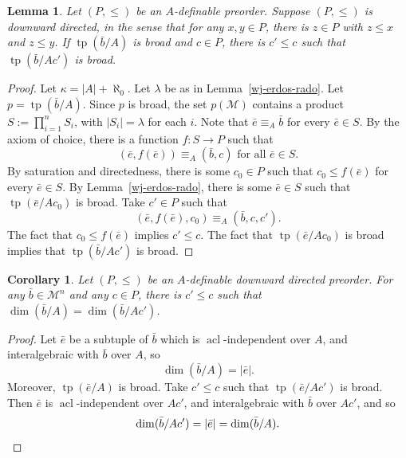 \documentclass{amsart}
\newtheorem{lemma}[theorem]{Lemma}
\newtheorem{corollary}[theorem]{Corollary}
\theoremstyle{definition}
\newcommand{\acl}{\operatorname{acl}}
\newcommand{\tp}{\operatorname{tp}}
\begin{document}
\begin{lemma}
  Let $(P,\le)$ be an $A$-definable preorder.  Suppose $(P,\le)$ is
  downward directed, in the sense that for any $x,y \in P$, there is
  $z \in P$ with $z \le x$ and $z \le y$.  If $\tp(\bar{b}/A)$ is broad
  and $c \in P$, there is $c' \le c$ such that $\tp(\bar{b}/Ac')$ is
  broad.
\end{lemma}
\begin{proof}
  Let $\kappa = |A| + \aleph_0$.  Let $\lambda$ be as in
  Lemma~\ref{wj-erdos-rado}.  Let $p = \tp(\bar{b}/A)$.  Since $p$ is broad,
  the set $p(\mathcal{M})$ contains a product $S := \prod_{i=1}^n S_i$, with
  $|S_i| = \lambda$ for each $i$.  Note that $\bar{e} \equiv_A \bar{b}$ for
  every $\bar{e} \in S$.  By the axiom of choice, there is a function $f :
  S \to P$ such that
  \begin{equation*}
    (\bar{e},f(\bar{e})) \equiv_A (\bar{b},c) \text{ for all } \bar{e} \in S.
  \end{equation*}
  By saturation and directedness, there is some $c_0 \in P$ such that
  $c_0 \le f(\bar{e})$ for every $\bar{e} \in S$.  By
  Lemma~\ref{wj-erdos-rado}, there is some $\bar{e} \in S$ such that
  $\tp(\bar{e}/Ac_0)$ is broad.  Take $c' \in P$ such that
  \begin{equation*}
    (\bar{e},f(\bar{e}),c_0) \equiv_A (\bar{b},c,c').
  \end{equation*}
  The fact that $c_0 \le f(\bar{e})$ implies $c' \le c$.  The fact
  that $\tp(\bar{e}/Ac_0)$ is broad implies that $\tp(\bar{b}/Ac')$ is
  broad.
\end{proof}

\begin{corollary}\label{wj-dim-case}
  Let $(P,\le)$ be an $A$-definable downward directed preorder.  For
  any $\bar{b} \in \mathcal{M}^n$ and any $c \in P$, there is $c' \le c$ such that
  $\dim(\bar{b}/A) = \dim(\bar{b}/Ac')$.
\end{corollary}
\begin{proof}
  Let $\bar{e}$ be a subtuple of $\bar{b}$ which is $\acl$-independent
  over $A$, and interalgebraic with $\bar{b}$ over $A$, so
  \begin{equation*}
    \dim(\bar{b}/A) = |\bar{e}|.
  \end{equation*}
  Moreover, $\tp(\bar{e}/A)$ is broad.  Take $c' \le c$ such that
  $\tp(\bar{e}/Ac')$ is broad.  Then $\bar{e}$ is $\acl$-independent
  over $Ac'$, and interalgebraic with $\bar{b}$ over $Ac'$, and so
  \begin{equation*}
    \dim(\bar{b}/Ac') = |\bar{e}| = \dim(\bar{b}/A).  \qedhere
  \end{equation*}
\end{proof}
\end{document}
